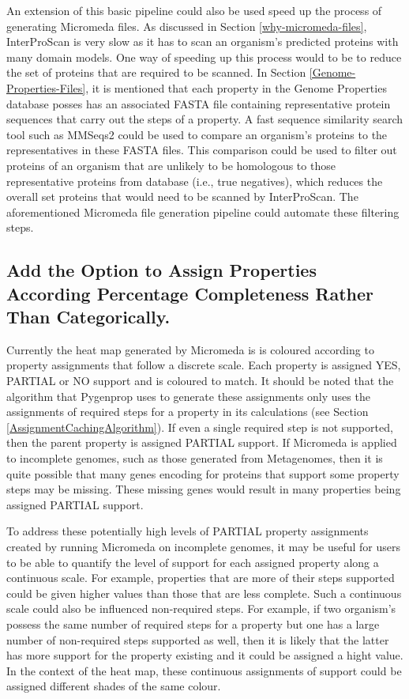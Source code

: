An extension of this basic pipeline could also be used speed up the process of generating Micromeda files. As discussed in Section \ref{why-micromeda-files}, InterProScan is very slow as it has to scan an organism's predicted proteins with many domain models. One way of speeding up this process would to be to reduce the set of proteins that are required to be scanned. In Section \ref{Genome-Properties-Files}, it is mentioned that each property in the Genome Properties database posses has an associated FASTA file containing representative protein sequences that carry out the steps of a property. A fast sequence similarity search tool such as MMSeqs2 \cite{steinegger2017mmseqs2} could be used to compare an organism's proteins to the representatives in these FASTA files. This comparison could be used to filter out proteins of an organism that are unlikely to be homologous to those representative proteins from database (i.e., true negatives), which reduces the overall set proteins that would need to be scanned by InterProScan. The aforementioned Micromeda file generation pipeline could automate these filtering steps.

\subsection{Add the Option to Assign Properties According Percentage Completeness Rather Than Categorically.}

Currently the heat map generated by Micromeda is is coloured according to property assignments that follow a discrete scale. Each property is assigned YES, PARTIAL or NO support and is coloured to match. It should be noted that the algorithm that Pygenprop uses to generate these assignments only uses the assignments of required steps for a property in its calculations (see Section \ref{AssignmentCachingAlgorithm}). If even a single required step is not supported, then the parent property is assigned PARTIAL support. If Micromeda is applied to incomplete genomes, such as those generated from Metagenomes, then it is quite possible that many genes encoding for proteins that support some property steps may be missing. These missing genes would result in many properties being assigned PARTIAL support. 

To address these potentially high levels of PARTIAL property assignments created by running Micromeda on incomplete genomes, it may be useful for users to be able to quantify the level of support for each assigned property along a continuous scale. For example, properties that are more of their steps supported could be given higher values than those that are less complete. Such a continuous scale could also be influenced non-required steps. For example, if two organism's possess the same number of required steps for a property but one has a large number of non-required steps supported as well, then it is likely that the latter has more support for the property existing and it could be assigned a hight value. In the context of the heat map, these continuous assignments of support could be assigned different shades of the same colour.

